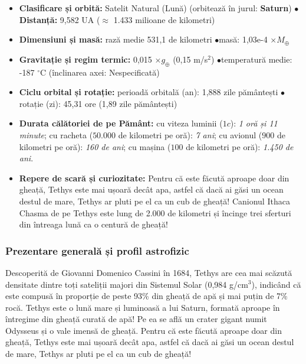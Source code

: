 \begin{tcolorbox}[orbitardata, title={\textbf{Repere esențiale: Tethys}}]
\small
\begin{itemize}[leftmargin=1.4em, itemsep=2pt, topsep=2pt]
  \item \textbf{Clasificare și orbită:} Satelit Natural (Lună) (orbitează în jurul: \textbf{Saturn}) \quad$\bullet$\quad \textbf{Distanță:} 9,582 UA ($\approx$ 1.433 milioane de kilometri)
  \item \textbf{Dimensiuni și masă:} rază medie 531,1 de kilometri \quad$\bullet$\quad masă: 1,03e-4 $\times M_\oplus$
  \item \textbf{Gravitație și regim termic:} 0,015 $\times g_\oplus$ (0,15 m/s$^2$) \quad$\bullet$\quad temperatură medie: -187 $^\circ$C (înclinarea axei: Nespecificată)
  \item \textbf{Ciclu orbital și rotație:} perioadă orbitală (an): 1,888 zile pământești \quad$\bullet$\quad rotație (zi): 45,31 ore (1,89 zile pământești)
  \item \textbf{Durata călătoriei de pe Pământ:} cu viteza luminii ($1c$): \emph{1 oră și 11 minute}; cu racheta ($50.000$ de kilometri pe oră): \emph{7 ani}; cu avionul ($900$ de kilometri pe oră): \emph{160 de ani}; cu mașina ($100$ de kilometri pe oră): \emph{1.450 de ani}.
  \item \textbf{Repere de scară și curiozitate:} Pentru că este făcută aproape doar din gheață, Tethys este mai ușoară decât apa, astfel că dacă ai găsi un ocean destul de mare, Tethys ar pluti pe el ca un cub de gheață! Canionul Ithaca Chasma de pe Tethys este lung de 2.000 de kilometri și încinge trei sferturi din întreaga lună ca o centură de gheață!
\end{itemize}
\end{tcolorbox}

\subsubsection*{Prezentare generală și profil astrofizic}
Descoperită de Giovanni Domenico Cassini în 1684, Tethys are cea mai scăzută densitate dintre toți sateliții majori din Sistemul Solar (0,984 g/cm$^3$), indicând că este compusă în proporție de peste 93\% din gheață de apă și mai puțin de 7\% rocă. Tethys este o lună mare și luminoasă a lui Saturn, formată aproape în întregime din gheață curată de apă! Pe ea se află un crater gigant numit Odysseus și o vale imensă de gheață. Pentru că este făcută aproape doar din gheață, Tethys este mai ușoară decât apa, astfel că dacă ai găsi un ocean destul de mare, Tethys ar pluti pe el ca un cub de gheață!

